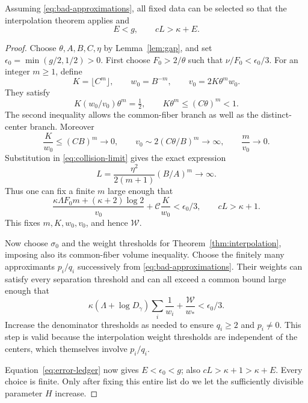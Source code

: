 \begin{proposition}\label{prop:choices}
Assuming \eqref{eq:bad-approximations}, all fixed data can be selected
so that the interpolation theorem applies and
\begin{equation}\label{eq:margins}
 E<g,\qquad cL>\kappa+E.
\end{equation}
\end{proposition}
\begin{proof}
Choose \(\theta,A,B,C,\eta\) by Lemma~\ref{lem:gap}, and set
\(\epsilon_0=\min(g/2,1/2)>0\).
First choose \(F_0>2/\theta\) such that
\(\nu/F_0<\epsilon_0/3\).
For an integer \(m\ge1\), define
\begin{equation}\label{eq:dimension-parameters}
 K=\lfloor C^m\rfloor,\qquad w_0=B^{-m},\qquad
 v_0=2K\theta^m w_0.
\end{equation}
They satisfy
\[
 K(w_0/v_0)\theta^m=\tfrac12,\qquad
 K\theta^m\le(C\theta)^m<1.
\]
The second inequality allows the common-fiber branch as well as the
distinct-center branch.
Moreover
\[
 \frac K{w_0}\le(CB)^m\longrightarrow0,\qquad
 v_0\sim2(C\theta/B)^m\longrightarrow\infty,\qquad
 \frac m{v_0}\longrightarrow0.
\]
Substitution in \eqref{eq:collision-limit} gives the exact expression
\begin{equation}\label{eq:L-dimension}
 L=\frac{\eta^2}{2(m+1)}(B/A)^m\longrightarrow\infty.
\end{equation}
Thus one can fix a finite \(m\) large enough that
\[
 \frac{\kappa\Lambda F_0m+(\kappa+2)\log2}{v_0}
       +\mathcal C\frac K{w_0}<\epsilon_0/3,
 \qquad cL>\kappa+1.
\]
This fixes \(m,K,w_0,v_0\), and hence \(\mathcal W\).

Now choose \(\sigma_0\) and the weight thresholds for
Theorem~\ref{thm:interpolation}, imposing also its common-fiber
volume inequality. Choose the finitely many approximants
\(p_i/q_i\) successively from \eqref{eq:bad-approximations}.
Their weights can satisfy every separation threshold and can all
exceed a common bound large enough that
\[
 \kappa(\Lambda+\log D_\gamma)\sum_i\frac1{w_i}
               +\frac{\mathcal W}{w_*}<\epsilon_0/3.
\]
Increase the denominator thresholds as needed to ensure \(q_i\ge2\)
and \(p_i\ne0\).
This step is valid because the interpolation weight thresholds are
independent of the centers, which themselves involve \(p_i/q_i\).

Equation~\eqref{eq:error-ledger} now gives \(E<\epsilon_0<g\);
also \(cL>\kappa+1>\kappa+E\).
Every choice is finite. Only after fixing this entire list do we let
the sufficiently divisible parameter \(H\) increase.
\end{proof}

